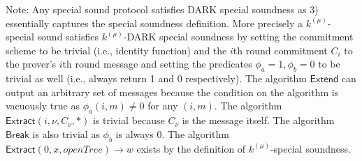 \textsf{Note:} Any special sound protocol satisfies DARK special soundness as 3) essentially captures the special soundness definition. More precisely a $k^{(\mu)}$-special sound satisfies $k^{(\mu)}$-DARK special soundness by setting the commitment scheme to be trivial (i.e., identity function) and the $i$th round commitment $C_i$ to the prover's $i$th round message and setting the predicates $\phi_a=1, \phi_b=0$ to be trivial as well (i.e., always return 1 and 0 respectively). The algorithm $\textsf{Extend}$ can output an arbitrary set of messages because the condition on the algorithm is vacuously true as $\phi_a(i,m) \neq 0$ for any $(i,m)$. The algorithm $\textsf{Extract}(i, \nu, C_\nu, *)$ is trivial because $C_\nu$ is the message itself. The algorithm $\textsf{Break}$ is also trivial as $\phi_b$ is always $0$. The algorithm $\textsf{Extract}(0, x, openTree) \rightarrow w$ exists by the definition of $k^{(\mu)}$-special soundness. %

